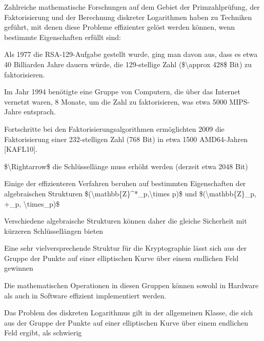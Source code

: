 \documentclass[a4paper]{article}
\begin{document}
\begin{multicols}{3}
\begin{itemize*}
            \begin{itemize*}
                  \item Zahlreiche mathematische Forschungen auf dem Gebiet der Primzahlprüfung, der Faktorisierung und der Berechnung diskreter Logarithmen haben zu Techniken geführt, mit denen diese Probleme effizienter gelöst werden können, wenn bestimmte Eigenschaften erfüllt sind:
                  \begin{itemize*} \item Als 1977 die RSA-129-Aufgabe gestellt wurde, ging man davon aus, dass es etwa 40 Billiarden Jahre dauern würde, die 129-stellige Zahl (\$\textbackslash approx 428\$ Bit) zu faktorisieren. \item Im Jahr 1994 benötigte eine Gruppe von Computern, die über das Internet vernetzt waren, 8 Monate, um die Zahl zu faktorisieren, was etwa 5000 MIPS-Jahre entsprach. \item Fortschritte bei den Faktorisierungsalgorithmen ermöglichten 2009 die Faktorisierung einer 232-stelligen Zahl (768 Bit) in etwa 1500 AMD64-Jahren {[}KAFL10{]}. \item \$\textbackslash Rightarrow\$ die Schlüssellänge muss erhöht werden (derzeit etwa 2048 Bit) \end{itemize*}
                  \item Einige der effizienteren Verfahren beruhen auf bestimmten Eigenschaften der algebraischen Strukturen \$(\textbackslash mathbb\{Z\}\^{}*\_p,\textbackslash times p)\$ und \$(\textbackslash mathbb\{Z\}\_p, +\_p, \textbackslash times\_p)\$
                  \item Verschiedene algebraische Strukturen können daher die gleiche Sicherheit mit kürzeren Schlüssellängen bieten
            \end{itemize*}
            \item
            Eine sehr vielversprechende Struktur für die Kryptographie lässt sich
            aus der Gruppe der Punkte auf einer elliptischen Kurve über einem
            endlichen Feld gewinnen

            \begin{itemize*}
                  \item Die mathematischen Operationen in diesen Gruppen können sowohl in Hardware als auch in Software effizient implementiert werden.
                  \item Das Problem des diskreten Logarithmus gilt in der allgemeinen Klasse, die sich aus der Gruppe der Punkte auf einer elliptischen Kurve über einem endlichen Feld ergibt, als schwierig
            \end{itemize*}
      \end{itemize*}



\end{multicols}
\end{document}
